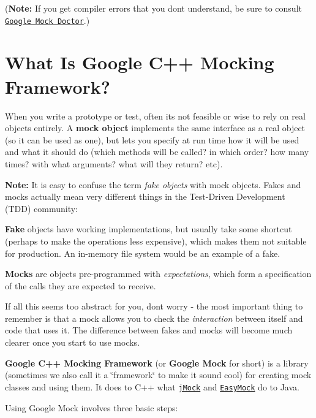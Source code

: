 ({\bfseries Note\+:} If you get compiler errors that you don\textquotesingle{}t understand, be sure to consult \href{FrequentlyAskedQuestions.md#how-am-i-supposed-to-make-sense-of-these-horrible-template-errors}{\tt Google Mock Doctor}.)

\section*{What Is Google C++ Mocking Framework?}

When you write a prototype or test, often it\textquotesingle{}s not feasible or wise to rely on real objects entirely. A {\bfseries mock object} implements the same interface as a real object (so it can be used as one), but lets you specify at run time how it will be used and what it should do (which methods will be called? in which order? how many times? with what arguments? what will they return? etc).

{\bfseries Note\+:} It is easy to confuse the term {\itshape fake objects} with mock objects. Fakes and mocks actually mean very different things in the Test-\/\+Driven Development (T\+DD) community\+:


\begin{DoxyItemize}
\item {\bfseries Fake} objects have working implementations, but usually take some shortcut (perhaps to make the operations less expensive), which makes them not suitable for production. An in-\/memory file system would be an example of a fake.
\item {\bfseries Mocks} are objects pre-\/programmed with {\itshape expectations}, which form a specification of the calls they are expected to receive.
\end{DoxyItemize}

If all this seems too abstract for you, don\textquotesingle{}t worry -\/ the most important thing to remember is that a mock allows you to check the {\itshape interaction} between itself and code that uses it. The difference between fakes and mocks will become much clearer once you start to use mocks.

{\bfseries Google C++ Mocking Framework} (or {\bfseries Google Mock} for short) is a library (sometimes we also call it a \char`\"{}framework\char`\"{} to make it sound cool) for creating mock classes and using them. It does to C++ what \href{http://www.jmock.org/}{\tt j\+Mock} and \href{http://www.easymock.org/}{\tt Easy\+Mock} do to Java.

Using Google Mock involves three basic steps\+:


